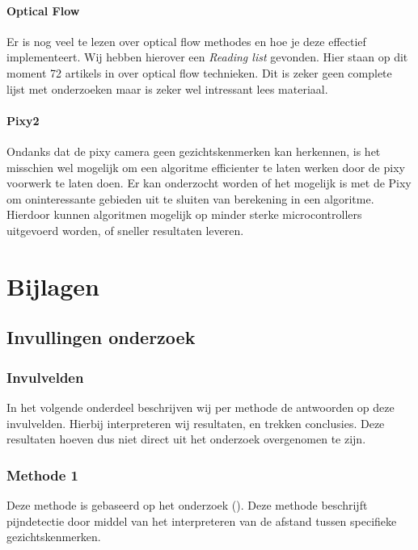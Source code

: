 \documentclass[11pt]{article}
\begin{document}
    \paragraph{Optical Flow} Er is nog veel te lezen over optical flow methodes en hoe je deze effectief implementeert.
    Wij hebben hierover een \emph{\citet{Readinglist} Reading list} gevonden.
    Hier staan op dit moment 72 artikels in over optical flow technieken. 
    Dit is zeker geen complete lijst met onderzoeken maar is zeker wel intressant lees materiaal.


    \paragraph{Pixy2} Ondanks dat de pixy camera geen gezichtskenmerken kan herkennen, is het misschien wel mogelijk om een algoritme efficienter te laten werken door de pixy voorwerk te laten doen.
    Er kan onderzocht worden of het mogelijk is met de Pixy om oninteressante gebieden uit te sluiten van berekening in een algoritme.
    Hierdoor kunnen algoritmen mogelijk op minder sterke microcontrollers uitgevoerd worden, of sneller resultaten leveren.




    \section{Bijlagen}\label{sec:bijlagen}

    \subsection{Invullingen onderzoek}\label{subsec:invullingen-onderzoek}

    \subsubsection{Invulvelden}
    In het volgende onderdeel beschrijven wij per methode de antwoorden op deze invulvelden.
    Hierbij interpreteren wij resultaten, en trekken conclusies.
    Deze resultaten hoeven dus niet direct uit het onderzoek overgenomen te zijn.

    \subsubsection{Methode 1}
    Deze methode is gebaseerd op het onderzoek (\citet{werner2014automatic}).
    Deze methode beschrijft pijndetectie door middel van het interpreteren van de afstand tussen specifieke gezichtskenmerken.
\end{document}

